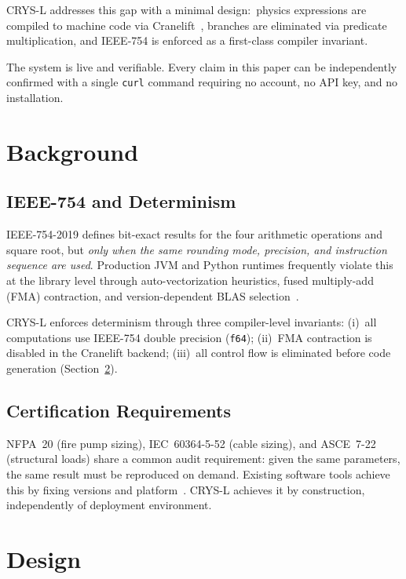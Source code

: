 \documentclass[10pt,twocolumn]{article}
\begin{document}
CRYS-L addresses this gap with a minimal design:\ physics expressions are
compiled to machine code via Cranelift~\cite{cranelift}, branches are eliminated via
predicate multiplication, and IEEE-754 is enforced as a first-class compiler invariant.

The system is live and verifiable. Every claim in this paper can be independently confirmed
with a single \texttt{curl} command requiring no account, no API key, and no installation.

\section{Background}
\label{sec:background}

\subsection{IEEE-754 and Determinism}

IEEE-754-2019 defines bit-exact results for the four arithmetic operations and square root,
but \emph{only when the same rounding mode, precision, and instruction sequence are used}.
Production JVM and Python runtimes frequently violate this at the library level through
auto-vectorization heuristics, fused multiply-add (FMA) contraction, and version-dependent
BLAS selection~\cite{monniaux2008pitfalls}.

CRYS-L enforces determinism through three compiler-level invariants:
(i)~all computations use IEEE-754 double precision (\texttt{f64});
(ii)~FMA contraction is disabled in the Cranelift backend;
(iii)~all control flow is eliminated before code generation (Section~\ref{sec:design}).

\subsection{Certification Requirements}

NFPA~20 (fire pump sizing), IEC~60364-5-52 (cable sizing), and ASCE~7-22
(structural loads) share a common audit requirement: given the same parameters,
the same result must be reproduced on demand. Existing software tools achieve this by
fixing versions and platform~\cite{nfpa20}. CRYS-L achieves it by construction,
independently of deployment environment.

\section{Design}
\label{sec:design}
\end{document}
